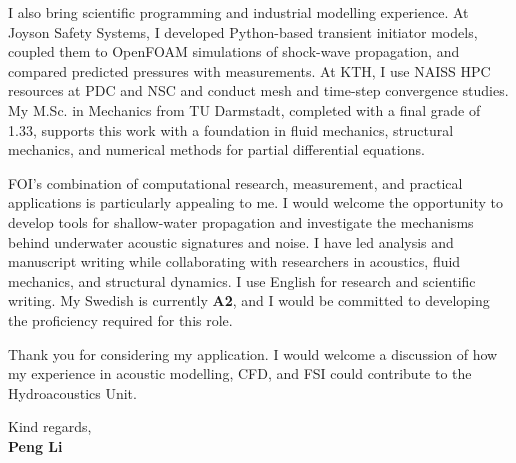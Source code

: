 \documentclass[a4paper,11pt]{article}
\begin{document}
I also bring scientific programming and industrial modelling experience.
At Joyson Safety Systems, I developed Python-based transient initiator models, coupled them
to OpenFOAM simulations of shock-wave propagation, and compared predicted pressures with
measurements. At KTH, I use NAISS HPC resources at PDC and NSC and conduct mesh and
time-step convergence studies. My M.Sc. in Mechanics from TU Darmstadt, completed with
a final grade of 1.33, supports this work with a foundation in fluid mechanics, structural
mechanics, and numerical methods for partial differential equations.

FOI's combination of computational research, measurement, and practical applications is
particularly appealing to me. I would welcome the opportunity to develop tools for shallow-water
propagation and investigate the mechanisms behind underwater acoustic signatures and noise.
I have led analysis and manuscript writing while collaborating with researchers in acoustics,
fluid mechanics, and structural dynamics. I use English for research and scientific writing.
My Swedish is currently \textbf{A2}, and I would be committed to developing the proficiency
required for this role.

Thank you for considering my application. I would welcome a discussion of how my experience
in acoustic modelling, CFD, and FSI could contribute to the Hydroacoustics Unit.

Kind regards,\\[3pt]
\textbf{Peng Li}
\end{document}
